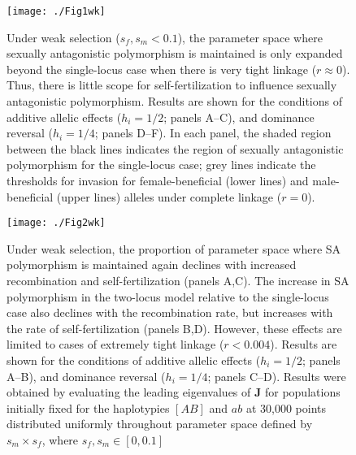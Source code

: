 \documentclass{article}
\begin{document}
\begin{figure}[H]
\texttt{[image: ./Fig1wk]}
\caption{Under weak selection ($s_f,s_m < 0.1$), the parameter space where sexually antagonistic polymorphism is maintained is only expanded beyond the single-locus case when there is very tight linkage ($r \approx 0$). Thus, there is little scope for self-fertilization to influence sexually antagonistic polymorphism. Results are shown for the conditions of additive allelic effects ($h_i = 1/2$; panels A--C), and dominance reversal ($h_i = 1/4$; panels D--F). In each panel, the shaded region between the black lines indicates the region of sexually antagonistic polymorphism for the single-locus case; grey lines indicate the thresholds for invasion for female-beneficial (lower lines) and male-beneficial (upper lines) alleles under complete linkage ($r = 0$).}
\label{fig:wkFunnelPlots}
\end{figure}
\newpage{}


\begin{figure}[H]
\texttt{[image: ./Fig2wk]}
\caption{Under weak selection, the proportion of parameter space where SA polymorphism is maintained again declines with increased recombination and self-fertilization (panels A,C). The increase in SA polymorphism in the two-locus model relative to the single-locus case also declines with the recombination rate, but increases with the rate of self-fertilization (panels B,D). However, these effects are limited to cases of extremely tight linkage ($r < 0.004$). Results are shown for the conditions of additive allelic effects ($h_i = 1/2$; panels A--B), and dominance reversal ($h_i = 1/4$; panels C--D). Results were obtained by evaluating the leading eigenvalues of $\mathbf{J}$ for populations initially fixed for the haplotypies $[AB]$ and $ab$ at 30,000 points distributed uniformly throughout parameter space defined by $s_m \times s_f$, where $s_f,s_m \in [0,0.1]$}
\label{fig:wkPolymorhism}
\end{figure}
\newpage{}

\end{document}
